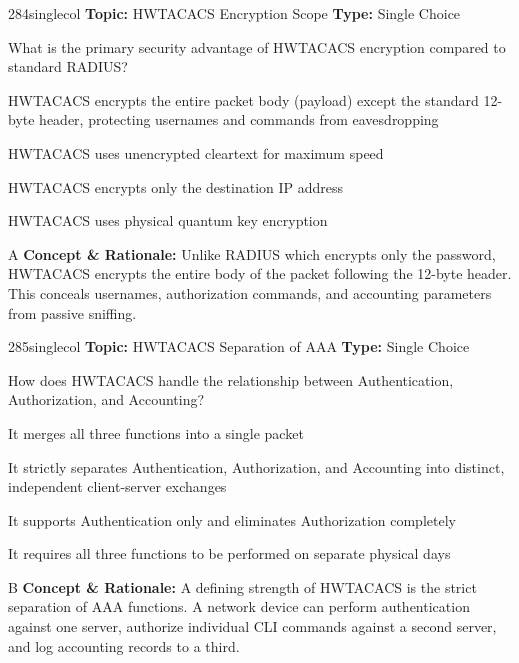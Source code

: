 \begin{qcard}{284}{singlecol}
\textcolor{darkslate!75}{\small\textbf{Topic:} HWTACACS Encryption Scope \hfill \textbf{Type:} Single Choice}\vspace{0.4em}\par
What is the primary security advantage of HWTACACS encryption compared to standard RADIUS?
\begin{qoptions}
\item HWTACACS encrypts the entire packet body (payload) except the standard 12-byte header, protecting usernames and commands from eavesdropping
\item HWTACACS uses unencrypted cleartext for maximum speed
\item HWTACACS encrypts only the destination IP address
\item HWTACACS uses physical quantum key encryption
\end{qoptions}
\end{qcard}
\nopagebreak
\begin{explainbox}{A}
\textbf{Concept \& Rationale:} Unlike RADIUS which encrypts only the password, HWTACACS encrypts the entire body of the packet following the 12-byte header. This conceals usernames, authorization commands, and accounting parameters from passive sniffing.
\end{explainbox}

\begin{qcard}{285}{singlecol}
\textcolor{darkslate!75}{\small\textbf{Topic:} HWTACACS Separation of AAA \hfill \textbf{Type:} Single Choice}\vspace{0.4em}\par
How does HWTACACS handle the relationship between Authentication, Authorization, and Accounting?
\begin{qoptions}
\item It merges all three functions into a single packet
\item It strictly separates Authentication, Authorization, and Accounting into distinct, independent client-server exchanges
\item It supports Authentication only and eliminates Authorization completely
\item It requires all three functions to be performed on separate physical days
\end{qoptions}
\end{qcard}
\nopagebreak
\begin{explainbox}{B}
\textbf{Concept \& Rationale:} A defining strength of HWTACACS is the strict separation of AAA functions. A network device can perform authentication against one server, authorize individual CLI commands against a second server, and log accounting records to a third.
\end{explainbox}

